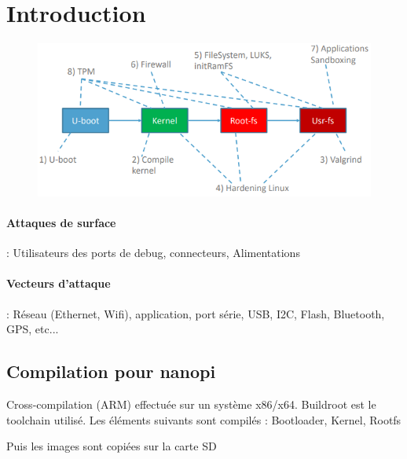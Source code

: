 \documentclass[resume]{subfiles}
\begin{document}
\section{Introduction}
\begin{figure}[H]
\centering
\includegraphics[width=0.8\columnwidth]{img_0.png}
\end{figure}
\paragraph{Attaques de surface}  : Utilisateurs des ports de debug, connecteurs, Alimentations
\paragraph{Vecteurs d'attaque} : Réseau (Ethernet, Wifi), application, port série, USB, I2C, Flash, Bluetooth, GPS, etc...
\subsection{Compilation pour nanopi}
Cross-compilation (ARM) effectuée sur un système x86/x64. Buildroot est le toolchain utilisé. Les éléments suivants sont compilés : Bootloader, Kernel, Rootfs

Puis les images sont copiées sur la carte SD
\end{document}
